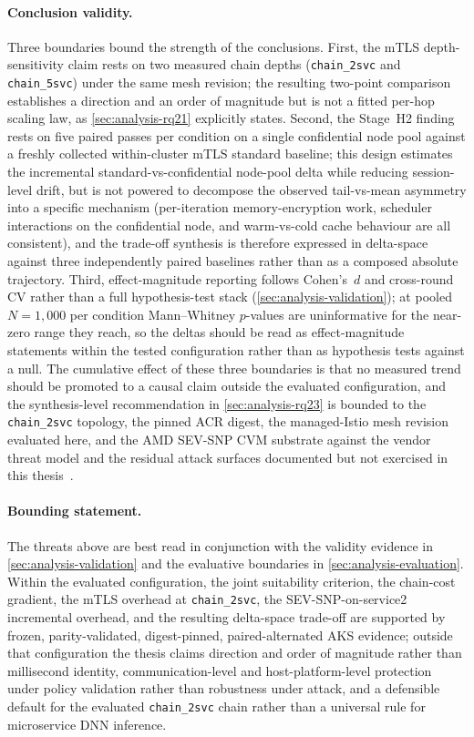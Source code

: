 \paragraph{Conclusion validity.}
Three boundaries bound the strength of the conclusions. First, the
mTLS depth-sensitivity claim rests on two measured chain depths
(\texttt{chain\_2svc} and \texttt{chain\_5svc}) under the same mesh
revision; the resulting two-point comparison establishes a direction
and an order of magnitude but is not a fitted per-hop scaling law, as
\cref{sec:analysis-rq21} explicitly states. Second, the Stage~H2 finding
rests on five paired passes per condition on a single confidential
node pool against a freshly collected within-cluster mTLS standard
baseline; this design estimates the incremental standard-vs-confidential
node-pool delta while reducing session-level drift, but is not powered to decompose the observed
tail-vs-mean asymmetry into a specific mechanism (per-iteration
memory-encryption work, scheduler interactions on the confidential
node, and warm-vs-cold cache behaviour are all consistent), and the
trade-off synthesis is therefore expressed in delta-space against three
independently paired baselines rather than as a composed absolute
trajectory. Third, effect-magnitude reporting follows Cohen's~$d$ and
cross-round CV rather than a full hypothesis-test stack
(\cref{sec:analysis-validation}); at pooled $N = 1{,}000$ per
condition Mann--Whitney $p$-values are uninformative for the
near-zero range they reach, so the deltas should be read as
effect-magnitude statements within the tested configuration rather
than as hypothesis tests against a null. The cumulative effect of
these three boundaries is that no measured trend should be promoted
to a causal claim outside the evaluated configuration, and the
synthesis-level recommendation in \cref{sec:analysis-rq23} is bounded
to the \texttt{chain\_2svc} topology, the pinned ACR digest, the
managed-Istio mesh revision evaluated here, and the AMD SEV-SNP CVM
substrate against the vendor threat model and the residual attack
surfaces documented but not exercised in this
thesis~\cite{schluter2024_heckler,he2021_attacking_collaborative}.

\paragraph{Bounding statement.}
The threats above are best read in conjunction with the validity
evidence in \cref{sec:analysis-validation} and the evaluative
boundaries in \cref{sec:analysis-evaluation}. Within the evaluated
configuration, the joint suitability criterion, the chain-cost
gradient, the mTLS overhead at \texttt{chain\_2svc}, the
SEV-SNP-on-service2 incremental overhead, and the resulting
delta-space trade-off are supported by frozen, parity-validated,
digest-pinned, paired-alternated AKS evidence; outside that
configuration the thesis claims direction and order of magnitude
rather than millisecond identity, communication-level and
host-platform-level protection under policy validation rather than
robustness under attack, and a defensible default for the evaluated
\texttt{chain\_2svc} chain rather than a universal rule for
microservice DNN inference.
